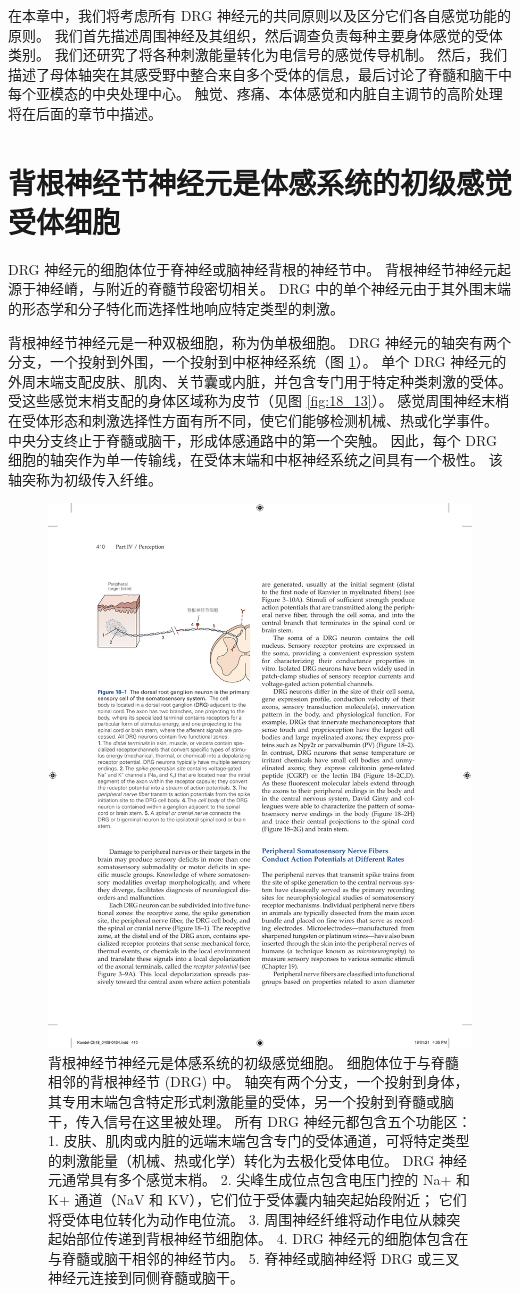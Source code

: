 在本章中，我们将考虑所有 DRG 神经元的共同原则以及区分它们各自感觉功能的原则。 
我们首先描述周围神经及其组织，然后调查负责每种主要身体感觉的受体类别。 
我们还研究了将各种刺激能量转化为电信号的感觉传导机制。 
然后，我们描述了母体轴突在其感受野中整合来自多个受体的信息，最后讨论了脊髓和脑干中每个亚模态的中央处理中心。 
触觉、疼痛、本体感觉和内脏自主调节的高阶处理将在后面的章节中描述。



\section{背根神经节神经元是体感系统的初级感觉受体细胞}

DRG 神经元的细胞体位于脊神经或脑神经背根的神经节中。 
背根神经节神经元起源于神经嵴，与附近的脊髓节段密切相关。 
DRG 中的单个神经元由于其外围末端的形态学和分子特化而选择性地响应特定类型的刺激。


背根神经节神经元是一种双极细胞，称为伪单极细胞。 
DRG 神经元的轴突有两个分支，一个投射到外围，一个投射到中枢神经系统（图 \ref{fig:18_1}）。 
单个 DRG 神经元的外周末端支配皮肤、肌肉、关节囊或内脏，并包含专门用于特定种类刺激的受体。 
受这些感觉末梢支配的身体区域称为皮节（见图 \ref{fig:18_13}）。 
感觉周围神经末梢在受体形态和刺激选择性方面有所不同，使它们能够检测机械、热或化学事件。 
中央分支终止于脊髓或脑干，形成体感通路中的第一个突触。 
因此，每个 DRG 细胞的轴突作为单一传输线，在受体末端和中枢神经系统之间具有一个极性。 
该轴突称为初级传入纤维。

\begin{figure}[htbp]
	\centering
	\includegraphics[width=0.5\linewidth]{chap18/fig_18_1}
	\caption{背根神经节神经元是体感系统的初级感觉细胞。 
		细胞体位于与脊髓相邻的背根神经节 (DRG) 中。 
		轴突有两个分支，一个投射到身体，其专用末端包含特定形式刺激能量的受体，另一个投射到脊髓或脑干，传入信号在这里被处理。 
		所有 DRG 神经元都包含五个功能区： 
		1. 皮肤、肌肉或内脏的远端末端包含专门的受体通道，可将特定类型的刺激能量（机械、热或化学）转化为去极化受体电位。 
		DRG 神经元通常具有多个感觉末梢。 
		2. 尖峰生成位点包含电压门控的 Na+ 和 K+ 通道（NaV 和 KV），它们位于受体囊内轴突起始段附近； 它们将受体电位转化为动作电位流。 
		3. 周围神经纤维将动作电位从棘突起始部位传递到背根神经节细胞体。 
		4. DRG 神经元的细胞体包含在与脊髓或脑干相邻的神经节内。 
		5. 脊神经或脑神经将 DRG 或三叉神经元连接到同侧脊髓或脑干。}
	\label{fig:18_1}
\end{figure}


